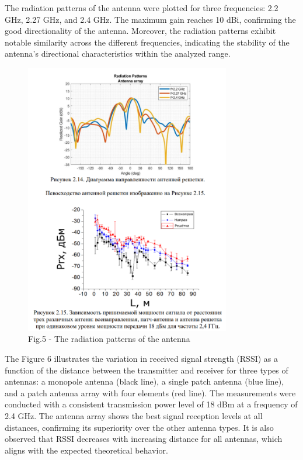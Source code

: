 \begin{multicols}{2}
The radiation patterns of the antenna were plotted for three
frequencies: 2.2 GHz, 2.27 GHz, and 2.4 GHz. The maximum gain reaches 10
dBi, confirming the good directionality of the antenna. Moreover, the
radiation patterns exhibit notable similarity across the different
frequencies, indicating the stability of the antenna's directional
characteristics within the analyzed range.
\end{multicols}

\begin{figure}[H]
	\centering
	\includegraphics[width=0.8\textwidth]{media/ict/image45}
	\caption*{Fig.5 - The radiation patterns of the antenna}
\end{figure}

\begin{multicols}{2}
The Figure 6 illustrates the variation in received signal strength
(RSSI) as a function of the distance between the transmitter and
receiver for three types of antennas: a monopole antenna (black line), a
single patch antenna (blue line), and a patch antenna array with four
elements (red line). The measurements were conducted with a consistent
transmission power level of 18 dBm at a frequency of 2.4 GHz. The
antenna array shows the best signal reception levels at all distances,
confirming its superiority over the other antenna types. It is also
observed that RSSI decreases with increasing distance for all antennas,
which aligns with the expected theoretical behavior.
\end{multicols}

